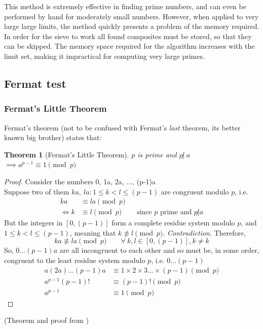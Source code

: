 \documentclass[12pt, titlepage]{article}
\newtheorem{theorem}{Theorem}
\begin{document}
    This method is extremely effective in finding prime numbers, and can even be performed
    by hand for moderately small numbers. However, when applied to very large large limits,
    the method quickly presents a problem of the memory required. In order for the sieve to
    work all found composites must be stored, so that they can be skipped. The memory space
    required for the algorithm increases with the limit set, making it impractical for
    computing very large primes.

           
    \subsection{Fermat test}
    \label{sec:fermat}

        \subsubsection{Fermat's Little Theorem}
        Fermat's theorem (not to be confused with Fermat's \emph{last} theorem, its better known
        big brother) states that:
        \begin{theorem}[Fermat's Little Theorem]
            $p$ is prime and $p \not|\ a$ $\implies a^{p-1} \equiv 1 \pmod{p}$
        \end{theorem}

        \begin{proof}
            Consider the numbers 0, 1a, 2a, ..., (p-1)a\\
            Suppose two of them $ka,\ la: 1\leq k < l \leq (p-1)$ are congruent modulo $p$, i.e.
            \begin{align*}
                      ka &\equiv la \pmod{p}\\
                \iff  k  &\equiv l  \pmod{p} &&\text{since $p$ prime and $p \not| a$}
            \end{align*}
            But the integers in $[0, (p-1)]$ form a complete residue system modulo $p$, and  $1
            \leq k<l \leq (p-1)$, meaning that $k \not\equiv l \pmod p$. \emph{Contradiction}.
            Therefore,
            \begin{equation*}
                ka \not\equiv la \pmod{p}\qquad \forall\ k,l \in [0, (p-1)], k \not= k
            \end{equation*}
            So, $0...(p-1)a$ are all incongruent to each other and so must be, in some order,
            congruent to the least residue system modulo $p$, i.e.  $0...(p-1)$
            \begin{align*}
                a(2a)...(p-1)a &\equiv 1\times 2\times 3...\times (p-1) \pmod{p}\\
                a^{p-1}(p-1)!  &\equiv (p-1)!                           \pmod{p}\\
                a^{p-1}        &\equiv 1                                \pmod{p}
            \end{align*}
        \end{proof}
        (Theorem and proof from \cite[109]{dence})
\end{document}
